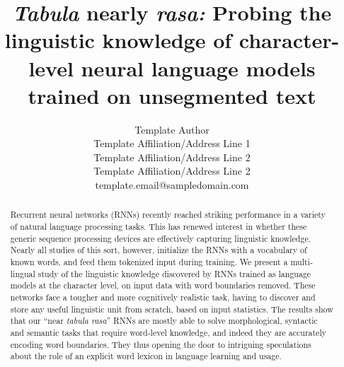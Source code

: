 \title{\emph{Tabula} nearly \emph{rasa:} Probing the linguistic knowledge of character-level neural language models trained on unsegmented text}


\author{
 Template Author \\
 Template Affiliation/Address Line 1 \\
 Template Affiliation/Address Line 2 \\
 Template Affiliation/Address Line 2 \\
  {\sf template.email@sampledomain.com} \\
}

\date{}


\maketitle
\begin{abstract}
  Recurrent neural networks (RNNs) recently reached striking
  performance in a variety of natural language processing tasks. This
  has renewed interest in whether these generic sequence processing
  devices are effectively capturing linguistic knowledge. Nearly all
  studies of this sort, however, initialize the RNNs with a vocabulary
  of known words, and feed them tokenized input during training. We
  present a multi-lingual study of the linguistic knowledge discovered
  by RNNs trained as language models at the character level, on input
  data with word boundaries removed. These networks face a tougher and
  more cognitively realistic task, having to discover and store any
  useful linguistic unit from scratch, based on input statistics. The
  results show that our ``near \emph{tabula rasa}'' RNNs are mostly
  able to solve morphological, syntactic and semantic tasks that
  require word-level knowledge, and indeed they are accurately
  encoding word boundaries. They thus opening the door to intriguing
  speculations about the role of an explicit word lexicon in language
  learning and usage.
\end{abstract}






